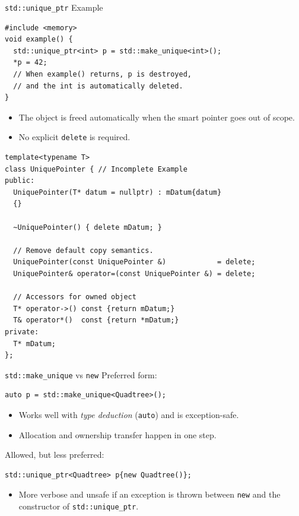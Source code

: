 \documentclass[14pt,aspectratio=1610]{beamer}
\begin{document}
\begin{frame}[fragile]{\texttt{std::unique\_ptr} Example}
\begin{lstlisting}
#include <memory>
void example() {
  std::unique_ptr<int> p = std::make_unique<int>();
  *p = 42;
  // When example() returns, p is destroyed,
  // and the int is automatically deleted.
}
\end{lstlisting}
\vspace{-0.5em}
\begin{itemize}
  \item The object is freed automatically when the smart pointer goes out of scope.
  \item No explicit \texttt{delete} is required.
\end{itemize}
\end{frame}

\begin{frame}[fragile]
\begin{lstlisting}[basicstyle=\ttfamily\footnotesize]
template<typename T>
class UniquePointer { // Incomplete Example
public:
  UniquePointer(T* datum = nullptr) : mDatum{datum}
  {}

  ~UniquePointer() { delete mDatum; }

  // Remove default copy semantics.
  UniquePointer(const UniquePointer &)            = delete;
  UniquePointer& operator=(const UniquePointer &) = delete;

  // Accessors for owned object
  T* operator->() const {return mDatum;}
  T& operator*()  const {return *mDatum;}
private:
  T* mDatum;
};
\end{lstlisting}
\end{frame}

\begin{frame}[fragile]{\texttt{std::make\_unique} vs \texttt{new}}
Preferred form:
\begin{lstlisting}
auto p = std::make_unique<Quadtree>();
\end{lstlisting}
\vspace{-1em}
\begin{itemize}
  \item Works well with \textit{type deduction} (\lstinline{auto}) and is exception-safe.
  \item Allocation and ownership transfer happen in one step.
\end{itemize}

Allowed, but less preferred:
\begin{lstlisting}
std::unique_ptr<Quadtree> p{new Quadtree()};
\end{lstlisting}
\vspace{-1em}
\begin{itemize}
  \item More verbose and unsafe if an exception is thrown between \lstinline{new} and the constructor of \lstinline{std::unique_ptr}.
\end{itemize}
\end{frame}
\end{document}
